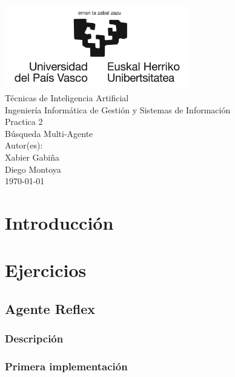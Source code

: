 \documentclass{report}
\begin{document}
    \begin{titlepage}
        \centering
        \includegraphics[width=0.6\textwidth]{./.img/logo.jpg}\\
        \vspace{1cm}
        \LARGE Técnicas de Inteligencia Artificial\\
        \vspace{0.5cm}
        \Large Ingeniería Informática de Gestión y Sistemas de Información\\
        \vspace{3cm}
        \Huge Practica 2\\
        \huge Búsqueda Multi-Agente\\
        \vspace{2.5cm}
        \Large Autor(es):\\
        \vspace{0.2cm}
        \large Xabier Gabiña\\
        \large Diego Montoya\\
        \vfill
        \today
    \end{titlepage}
    \tableofcontents
    \listoffigures
    \lstlistoflistings
    \chapter{Introducción}
    \chapter{Ejercicios}
      \section{Agente Reflex}
        \subsection{Descripción}
        \subsection{Primera implementación}
          \begin{lstlisting}[language=Python, caption=Implementación del agente reflex]
          \end{lstlisting}
\end{document}

